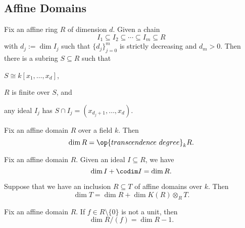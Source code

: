 \documentclass{article}
\begin{document}
\subsection{Affine Domains}
\begin{theorem*}[Theorem 13.3] \label{thm:noethernormal}
	Fix an affine ring $R$ of dimension $d$. Given a chain
	\[I_1\subseteq I_2\subseteq\cdots\subseteq I_m\subseteq R\]
	with $d_j:=\dim I_j$ such that $\{d_j\}_{j=0}^m$ is strictly decreasing and $d_m>0$. Then there is a subring $S\subseteq R$ such that
	\begin{listalph}
		\item $S\cong k[x_1,\ldots,x_d]$,
		\item $R$ is finite over $S$, and
		\item any ideal $I_j$ has $S\cap I_j=(x_{d_j+1},\ldots,x_d)$.
	\end{listalph}
\end{theorem*}
\begin{theorem*}[Theorem A]
	Fix an affine domain $R$ over a field $k$. Then
	\[\dim R=\op{transcendence~degree}_kR.\]
\end{theorem*}
\begin{corollary*}[Corollary 13.4]
	Fix an affine domain $R$. Given an ideal $I\subseteq R$, we have
	\[\dim I+\codim I=\dim R.\]
\end{corollary*}
\begin{corollary*}[Corollary 13.5]
	Suppose that we have an inclusion $R\subseteq T$ of affine domains over $k$. Then
	\[\dim T=\dim R+\dim K(R)\otimes_RT.\]
\end{corollary*}
\begin{cor*}[Corollary 13.11]
	Fix an affine domain $R$. If $f\in R\setminus\{0\}$ is not a unit, then
	\[\dim R/(f)=\dim R-1.\]
\end{cor*}
\end{document}
